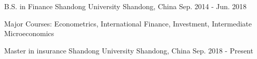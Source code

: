


\begin{cventries}


\cventry
{B.S. in Finance} %
{Shandong University} %
{Shandong, China} %
{Sep. 2014 - Jun. 2018} %
{ %
\begin{cvitems}
\item {Major Courses: Econometrics, International Finance, Investment, Intermediate Microeconomics}
\end{cvitems}
}

\cventry
{Master in insurance}
{Shandong University}
{Shandong, China}
{Sep. 2018 - Present}
{
}

\end{cventries}